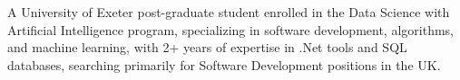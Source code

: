 
\vspace{-1mm}
\color{sectiondivider}\vhrulefill{0.9pt}
\begin{cvparagraph}

A University of Exeter post-graduate student enrolled in the Data Science with Artificial Intelligence program, specializing in software development, algorithms, and machine learning, with 2+ years of expertise in .Net tools and SQL databases, searching primarily for Software Development positions in the UK.%
\end{cvparagraph}
